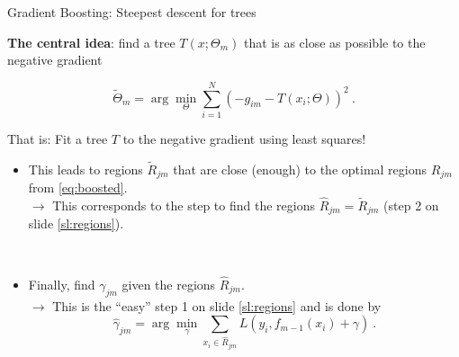 \documentclass[
  10pt,
  ignorenonframetext,
]{beamer}
\providecommand{\tightlist}{%
  \setlength{\itemsep}{0pt}\setlength{\parskip}{0pt}}
\begin{document}
\begin{frame}
\begin{block}{Gradient Boosting: Steepest descent for trees}
\protect\hypertarget{gradient-boosting-steepest-descent-for-trees}{}
\(~\)

\textbf{The central idea}: find a tree \(T(x;\Theta_m)\) that is as
close as possible to the negative gradient

\begin{equation}
\tilde{\Theta}_m= \arg \min_\Theta \sum_{i=1}^N (-g_{im} -T(x_i;\Theta))^2 \ .
\end{equation}

\vspace{8mm}

That is: Fit a tree \(T\) to the negative gradient using least squares!
\end{block}
\end{frame}

\begin{frame}
\vspace{2mm}

\begin{itemize}
\tightlist
\item
  This leads to regions \(\tilde{R}_{jm}\) that are close (enough) to
  the optimal regions \(R_{jm}\) from \eqref{eq:boosted}.\\
  \vspace{2mm} \(\rightarrow\) This corresponds to the step to find the
  regions \(\hat{R}_{jm}=\tilde{R}_{jm}\) (step 2 on slide
  \ref{sl:regions}).
\end{itemize}

\(~\)

\begin{itemize}
\tightlist
\item
  Finally, find \(\gamma_{jm}\) given the regions \(\hat{R}_{jm}\).\\
  \vspace{2mm} \(\rightarrow\) This is the ``easy'' step 1 on slide
  \ref{sl:regions} and is done by \begin{equation*}
  \hat\gamma_{jm} = \arg \min_{\gamma} \sum_{x_i \in \hat{R}_{jm}} L(y_i, f_{m-1}(x_i) + \gamma) \ .
  \end{equation*}
\end{itemize}
\end{frame}
\end{document}
